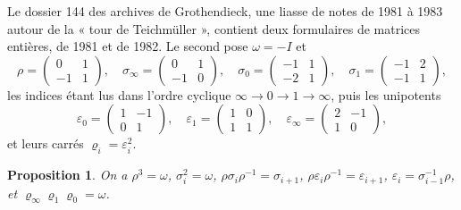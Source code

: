 \documentclass[11pt,a4paper]{article}
\theoremstyle{plain}
\newtheorem{proposition}[theoreme]{Proposition}
\theoremstyle{definition}
\theoremstyle{remark}
\begin{document}
Le dossier 144 des archives de Grothendieck, une liasse de notes de 1981 à 1983 autour de la « tour de Teichmüller », contient deux formulaires de matrices entières, de 1981 et de 1982. Le second pose $\omega=-I$ et
\[
  \rho=\begin{pmatrix}0&1\\-1&1\end{pmatrix},\quad
  \sigma_\infty=\begin{pmatrix}0&1\\-1&0\end{pmatrix},\quad
  \sigma_0=\begin{pmatrix}-1&1\\-2&1\end{pmatrix},\quad
  \sigma_1=\begin{pmatrix}-1&2\\-1&1\end{pmatrix},
\]
les indices étant lus dans l'ordre cyclique $\infty\to0\to1\to\infty$, puis les unipotents
\[
  \varepsilon_0=\begin{pmatrix}1&-1\\0&1\end{pmatrix},\quad
  \varepsilon_1=\begin{pmatrix}1&0\\1&1\end{pmatrix},\quad
  \varepsilon_\infty=\begin{pmatrix}2&-1\\1&0\end{pmatrix},
\]
et leurs carrés $\varrho_i=\varepsilon_i^2$.

\begin{proposition}\label{prop:formulaire}
On a $\rho^3=\omega$, $\sigma_i^2=\omega$, $\rho\sigma_i\rho^{-1}=\sigma_{i+1}$, $\rho\varepsilon_i\rho^{-1}=\varepsilon_{i+1}$, $\varepsilon_i=\sigma_{i-1}^{-1}\rho$, et $\varrho_\infty\varrho_1\varrho_0=\omega$.
\end{proposition}
\end{document}
